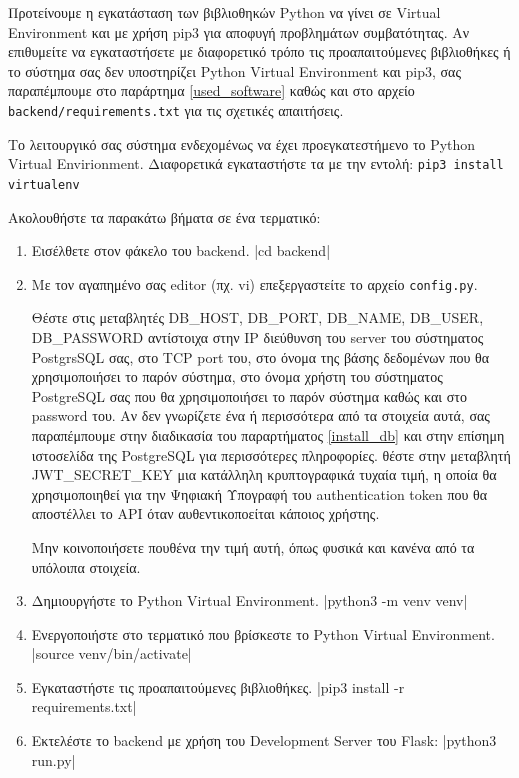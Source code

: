 \documentclass[a4paper]{article}
\begin{document}
\par Προτείνουμε η εγκατάσταση των βιβλιοθηκών Python να γίνει σε Virtual Environment και με χρήση pip3 για αποφυγή προβλημάτων συμβατότητας. Αν επιθυμείτε να εγκαταστήσετε με διαφορετικό τρόπο τις προαπαιτούμενες βιβλιοθήκες ή το σύστημα σας δεν υποστηρίζει Python Virtual Environment και pip3, σας παραπέμπουμε στο παράρτημα \ref{used_software} καθώς και στο αρχείο \texttt{backend/requirements.txt} για τις σχετικές απαιτήσεις.

\par Το λειτουργικό σας σύστημα ενδεχομένως να έχει προεγκατεστήμενο το Python Virtual Envirionment. Διαφορετικά εγκαταστήστε τα με την εντολή: \texttt{pip3 install virtualenv}

\par Ακολουθήστε τα παρακάτω βήματα σε ένα τερματικό:
\begin{enumerate}
    \item Εισέλθετε στον φάκελο του backend.
        |cd backend|
    \item Με τον αγαπημένο σας editor (πχ. vi) επεξεργαστείτε το αρχείο \texttt{config.py}.
        \par Θέστε στις μεταβλητές DB\_HOST, DB\_PORT, DB\_NAME, DB\_USER, DB\_PASSWORD αντίστοιχα στην IP διεύθυνση του server του σύστηματος PostgrsSQL σας, στο TCP port του, στο όνομα της βάσης δεδομένων που θα χρησιμοποιήσει το παρόν σύστημα, στο όνομα χρήστη του σύστηματος PostgreSQL σας που θα χρησιμοποιήσει το παρόν σύστημα καθώς και στο password του. Αν δεν γνωρίζετε ένα ή περισσότερα από τα στοιχεία αυτά, σας παραπέμπουμε στην διαδικασία του παραρτήματος \ref{install_db} και στην επίσημη ιστοσελίδα της PostgreSQL για περισσότερες πληροφορίες.
         θέστε στην μεταβλητή JWT\_SECRET\_KEY μια κατάλληλη κρυπτογραφικά τυχαία τιμή, η οποία θα χρησιμοποιηθεί για την Ψηφιακή Υπογραφή του authentication token που θα αποστέλλει το API όταν αυθεντικοποείται κάποιος χρήστης.
        \par Μην κοινοποιήσετε πουθένα την τιμή αυτή, όπως φυσικά και κανένα από τα υπόλοιπα στοιχεία.
    \item Δημιουργήστε το Python Virtual Environment.
        |python3 -m venv venv|
    \item Ενεργοποιήστε στο τερματικό που βρίσκεστε το Python Virtual Environment.
        |source venv/bin/activate|
    \item Εγκαταστήστε τις προαπαιτούμενες βιβλιοθήκες.
        |pip3 install -r requirements.txt|
    \item Εκτελέστε το backend με χρήση του Development Server του Flask:
        |python3 run.py|
\end{enumerate}
\end{document}

